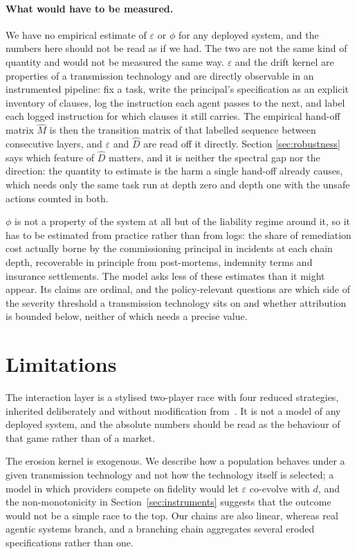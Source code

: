 \documentclass[11pt,a4paper]{article}
\theoremstyle{definition}
\begin{document}
\paragraph{What would have to be measured.}
We have no empirical estimate of $\varepsilon$ or $\phi$ for any deployed
system, and the numbers here should not be read as if we had. The two are not
the same kind of quantity and would not be measured the same way.
$\varepsilon$ and the drift kernel are properties of a transmission technology
and are directly observable in an instrumented pipeline: fix a task, write the
principal's specification as an explicit inventory of clauses, log the
instruction each agent passes to the next, and label each logged instruction
for which clauses it still carries. The empirical hand-off matrix $\hat{M}$ is
then the transition matrix of that labelled sequence between consecutive
layers, and $\varepsilon$ and $\hat{D}$ are read off it directly. Section
\ref{sec:robustness} says which feature of $\hat{D}$ matters, and it is neither
the spectral gap nor the direction: the quantity to estimate is the harm a
single hand-off already causes, which needs only the same task run at depth
zero and depth one with the unsafe actions counted in both.

$\phi$ is not a property of the system at all but of the liability regime
around it, so it has to be estimated from practice rather than from logs: the
share of remediation cost actually borne by the commissioning principal in
incidents at each chain depth, recoverable in principle from post-mortems,
indemnity terms and insurance settlements. The model asks less of these
estimates than it might appear. Its claims are ordinal, and the policy-relevant
questions are which side of the severity threshold a transmission technology
sits on and whether attribution is bounded below, neither of which needs a
precise value.

\section{Limitations}
\label{sec:limitations}

The interaction layer is a stylised two-player race with four reduced
strategies, inherited deliberately and without modification
from~\citet{domingos2026falling}. It is not a model of any deployed system, and the
absolute numbers should be read as the behaviour of that game rather than of a
market.

The erosion kernel is exogenous. We describe how a population behaves under a
given transmission technology and not how the technology itself is selected;
a model in which providers compete on fidelity would let $\varepsilon$
co-evolve with $d$, and the non-monotonicity in Section~\ref{sec:instruments}
suggests that the outcome would not be a simple race to the top. Our chains are
also linear, whereas real agentic systems branch, and a branching chain
aggregates several eroded specifications rather than one.
\end{document}
